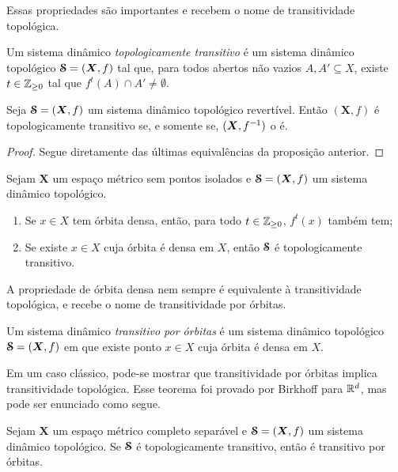 Essas propriedades são importantes e recebem o nome de transitividade topológica.

\begin{definition}
Um  sistema dinâmico \emph{topologicamente transitivo} é um sistema dinâmico topológico $\bm{\mathcal{S}} = (\bm X,f)$ tal que, para todos abertos não vazios $A,A' \subseteq X$, existe $t \in \mathbb{Z}_{\geq 0}$ tal que $f^t(A) \cap A' \neq \emptyset$.
\end{definition}

\begin{proposition}
Seja $\bm{\mathcal{S}} = (\bm X,f)$ um sistema dinâmico topológico revertível. Então $(\bm X,f)$ é topologicamente transitivo se, e somente se, $(\bm X,f^{-1})$ o é.
\end{proposition}
\begin{proof}
Segue diretamente das últimas equivalências da proposição anterior.
\end{proof}


\begin{proposition}
Sejam $\bm X$ um espaço métrico sem pontos isolados e $\bm{\mathcal{S}} = (\bm X,f)$ um sistema dinâmico topológico.
	\begin{enumerate}
	\item Se $x \in X$ tem órbita densa, então, para todo $t \in \mathbb{Z}_{\geq 0}$, $f^t(x)$ também tem;
	\item Se existe $x \in X$ cuja órbita é densa em $X$, então $\bm{\mathcal{S}}$ é topologicamente transitivo.
	\end{enumerate}
\end{proposition}

A propriedade de órbita densa nem sempre é equivalente à transitividade topológica, e recebe o nome de transitividade por órbitas.

\begin{definition}
Um sistema dinâmico \emph{transitivo por órbitas} é um sistema dinâmico topológico $\bm{\mathcal{S}}=(\bm X,f)$ em que existe ponto $x \in X$ cuja órbita é densa em $X$.
\end{definition}

Em um caso clássico, pode-se mostrar que transitividade por órbitas implica transitividade topológica. Esse teorema foi provado por Birkhoff para $\mathbb{R}^d$, mas pode ser enunciado como segue.

\begin{proposition}
Sejam $\bm X$ um espaço métrico completo separável e $\bm{\mathcal{S}} = (\bm X,f)$ um sistema dinâmico topológico. Se $\bm{\mathcal{S}}$ é topologicamente transitivo, então é transitivo por órbitas.
\end{proposition}











